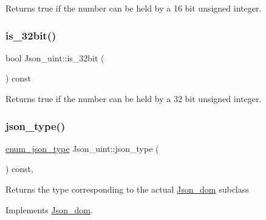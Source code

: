 \begin{DoxyReturn}{Returns}
true if the number can be held by a 16 bit unsigned integer. 
\end{DoxyReturn}
\mbox{\label{classJson__uint_af1bc8090273ccd300a0dd0bd37f11c0e}} 
\subsubsection{\texorpdfstring{is\+\_\+32bit()}{is\_32bit()}}
{\footnotesize\ttfamily bool Json\+\_\+uint\+::is\+\_\+32bit (\begin{DoxyParamCaption}{ }\end{DoxyParamCaption}) const\hspace{0.3cm}{\ttfamily [inline]}}

\begin{DoxyReturn}{Returns}
true if the number can be held by a 32 bit unsigned integer. 
\end{DoxyReturn}
\mbox{\label{classJson__uint_abd22e524380fa02063f5ae9062ff742e}} 
\subsubsection{\texorpdfstring{json\+\_\+type()}{json\_type()}}
{\footnotesize\ttfamily \mbox{\hyperlink{classJson__dom_af37eed7dfe1da1d6507d3ab85320eb03}{enum\+\_\+json\+\_\+type}} Json\+\_\+uint\+::json\+\_\+type (\begin{DoxyParamCaption}{ }\end{DoxyParamCaption}) const\hspace{0.3cm}{\ttfamily [inline]}, {\ttfamily [virtual]}}

\begin{DoxyReturn}{Returns}
the type corresponding to the actual \mbox{\hyperlink{classJson__dom}{Json\+\_\+dom}} subclass 
\end{DoxyReturn}


Implements \mbox{\hyperlink{classJson__dom_aed953eca1e112aade66511ad1bbf82b8}{Json\+\_\+dom}}.

\mbox{\label{classJson__uint_a50765d292cd254e77518ab42c4a3e2c4}} 
